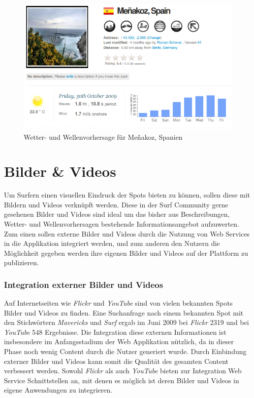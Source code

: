 \begin{figure}[h]
 \includegraphics[width=\textwidth]{bilder/forecast}
 \caption{Wetter- und Wellenvorhersage für Meñakoz, Spanien}
 \label{forecast}
\end{figure}

\section{Bilder \& Videos}
Um Surfern einen visuellen Eindruck der Spots bieten zu können, sollen
diese mit Bildern und Videos verknüpft werden. Diese in der Surf
Community gerne gesehenen Bilder und Videos sind ideal um das bisher
aus Beschreibungen, Wetter- und Wellenvorhersagen bestehende
Informationsangebot aufzuwerten. Zum einen sollen externe Bilder und
Videos durch die Nutzung von Web Services in die Applikation
integriert werden, und zum anderen den Nutzern die Möglichkeit gegeben
werden ihre eigenen Bilder und Videos auf der Plattform zu
publizieren.

\subsubsection{Integration externer Bilder und Videos}
Auf Internetseiten wie \textit{Flickr} und \textit{YouTube} sind von
vielen bekannten Spots Bilder und Videos zu finden. Eine Suchanfrage
nach einem bekannten Spot mit den Stichwörtern \textit{Mavericks} und
\textit{Surf} ergab im Juni 2009 bei \textit{Flickr} 2319 und bei
\textit{YouTube} 548 Ergebnisse. Die Integration diese externen
Informationen ist insbesondere im Anfangsstadium der Web Applikation
nützlich, da in dieser Phase noch wenig Content durch die Nutzer
generiert wurde. Durch Einbindung externer Bilder und Videos kann
somit die Qualität des gesamten Content verbessert werden. Sowohl
\textit{Flickr} als auch \textit{YouTube} bieten zur Integration Web
Service Schnittstellen an, mit denen es möglich ist deren Bilder und
Videos in eigene Anwendungen zu integrieren.

